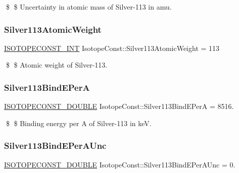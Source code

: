 \$ \$ Uncertainty in atomic mass of Silver-\/113 in amu. \mbox{\label{group___isotope_const-_silver-_ag113_ga2fa15e73b63f581c0028b5c172ef1671}} 
\subsubsection{\texorpdfstring{Silver113\+Atomic\+Weight}{Silver113AtomicWeight}}
{\footnotesize\ttfamily \mbox{\hyperlink{group___isotope_const-_macros_ga5f18360b3e99483a35c32d789e62621c}{I\+S\+O\+T\+O\+P\+E\+C\+O\+N\+S\+T\+\_\+\+I\+NT}} Isotope\+Const\+::\+Silver113\+Atomic\+Weight = 113}

\$ \$ Atomic weight of Silver-\/113. \mbox{\label{group___isotope_const-_silver-_ag113_gab2605b5183efdc43cbca4dd5de3285a9}} 
\subsubsection{\texorpdfstring{Silver113\+Bind\+E\+PerA}{Silver113BindEPerA}}
{\footnotesize\ttfamily \mbox{\hyperlink{group___isotope_const-_macros_ga8f45a7272ce02c0b4c65c44636ed719a}{I\+S\+O\+T\+O\+P\+E\+C\+O\+N\+S\+T\+\_\+\+D\+O\+U\+B\+LE}} Isotope\+Const\+::\+Silver113\+Bind\+E\+PerA = 8516.}

\$ \$ Binding energy per A of Silver-\/113 in keV. \mbox{\label{group___isotope_const-_silver-_ag113_gab0ebfbc8b9bdc64e23553079b294ce7d}} 
\subsubsection{\texorpdfstring{Silver113\+Bind\+E\+Per\+A\+Unc}{Silver113BindEPerAUnc}}
{\footnotesize\ttfamily \mbox{\hyperlink{group___isotope_const-_macros_ga8f45a7272ce02c0b4c65c44636ed719a}{I\+S\+O\+T\+O\+P\+E\+C\+O\+N\+S\+T\+\_\+\+D\+O\+U\+B\+LE}} Isotope\+Const\+::\+Silver113\+Bind\+E\+Per\+A\+Unc = 0.}

